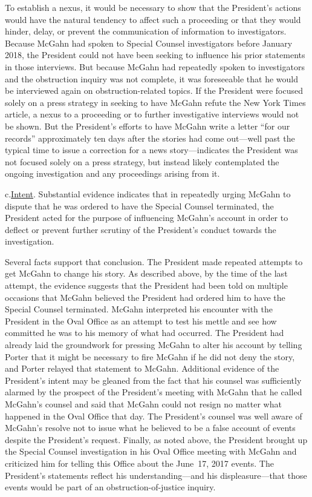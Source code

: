 To establish a nexus, it would be necessary to show that the President's actions would have the natural tendency to affect such a proceeding or that they would hinder, delay, or prevent the communication of information to investigators.
Because McGahn had spoken to Special Counsel investigators before January 2018, the President could not have been seeking to influence his prior statements in those interviews.
But because McGahn had repeatedly spoken to investigators and the obstruction inquiry was not complete, it was foreseeable that he would be interviewed again on obstruction-related topics.
If the President were focused solely on a press strategy in seeking to have McGahn refute the New York Times article, a nexus to a proceeding or to further investigative interviews would not be shown.
But the President's efforts to have McGahn write a letter ``for our records'' approximately ten days after the stories had come out---well past the typical time to issue a correction for a news story---indicates the President was not focused solely on a press strategy, but instead likely contemplated the ongoing investigation and any proceedings arising from it.

c.\qquad\underline{Intent}.
Substantial evidence indicates that in repeatedly urging McGahn to dispute that he was ordered to have the Special Counsel terminated, the President acted for the purpose of influencing McGahn's account in order to deflect or prevent further scrutiny of the President's conduct towards the investigation.

Several facts support that conclusion.
The President made repeated attempts to get McGahn to change his story.
As described above, by the time of the last attempt, the evidence suggests that the President had been told on multiple occasions that McGahn believed the President had ordered him to have the Special Counsel terminated.
McGahn interpreted his encounter with the President in the Oval Office as an attempt to test his mettle and see how committed he was to his memory of what had occurred.
The President had already laid the groundwork for pressing McGahn to alter his account by telling Porter that it might be necessary to fire McGahn if he did not deny the story, and Porter relayed that statement to McGahn.
Additional evidence of the President's intent may be gleaned from the fact that his counsel was sufficiently alarmed by the prospect of the President's meeting with McGahn that he called McGahn's counsel and said that McGahn could not resign no matter what happened in the Oval Office that day.
The President's counsel was well aware of McGahn's resolve not to issue what he believed to be a false account of events despite the President's request.
Finally, as noted above, the President brought up the Special Counsel investigation in his Oval Office meeting with McGahn and criticized him for telling this Office about the June~17, 2017 events.
The President's statements reflect his understanding---and his displeasure---that those events would be part of an obstruction-of-justice inquiry.

